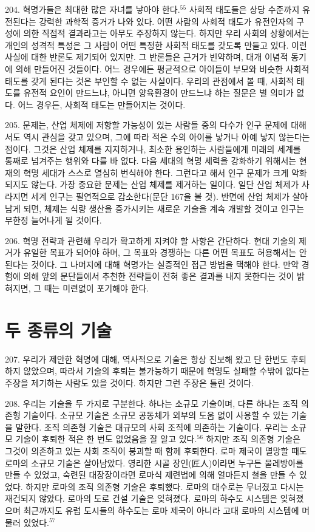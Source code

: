 \documentclass[11pt,a4paper]{article}
\begin{document}
\begin{multicols}{2}
204. 혁명가들은 최대한 많은 자녀를 낳아야 한다.\hyperlink{55}{$^{55}$} 사회적 태도들은 상당 수준까지 유전된다는 강력한  과학적 증거가 나와 있다. 어떤 사람의 사회적 태도가 유전인자의 구성에 의한 직접적 결과라고는 아무도  주장하지 않는다. 하지만 우리 사회의 상황에서는 개인의 성격적 특성은 그 사람이 어떤 특정한 사회적  태도를 갖도록 만들고 있다. 이런 사실에 대한 반론도 제기되어 있지만. 그 반론들은 근거가 빈약하며, 
대개 이념적 동기에 의해 만들어진 것들이다. 어느 경우에든 평균적으로 아이들이 부모와 비슷한 사회적  태도를 갖게 된다는 것은 부인할 수 없는 사실이다. 우리의 관점에서 볼 때, 사회적 태도를 유전적 요인이  만드느냐, 아니면 양육환경이 만드느냐 하는 질문은 별 의미가 없다. 어느 경우든, 사회적 태도는  만들어지는 것이다. 


205. 문제는, 산업 체제에 저항할 가능성이 있는 사람들 중의 다수가 인구 문제에 대해서도 역시 관심을  갖고 있으며, 그에 따라 적은 수의 아이를 낳거나 아예 낳지 않는다는 점이다. 그것은 산업 체제를  지지하거나, 최소한 용인하는 사람들에게 미래의 세계를 통째로 넘겨주는 행위와 다를 바 없다. 다음 세대의 혁명 세력을 강화하기 위해서는 현재의 혁명 세대가 스스로 열심히 번식해야 한다. 그런다고 해서  인구 문제가 크게 악화되지도 않는다. 가장 중요한 문제는 산업 체제를 제거하는 일이다. 일단 산업  체제가 사라지면 세계 인구는 필연적으로 감소한다(문단 167을 볼 것). 반면에 산업 체제가 살아남게  되면, 체제는 식량 생산을 증가시키는 새로운 기술을 계속 개발할 것이고 인구는 무한정 늘어나게 될  것이다.  


206. 혁명 전략과 관련해 우리가 확고하게 지켜야 할 사항은 간단하다. 현대 기술의 제거가 유일한  목표가 되어야 하며, 그 목표와 경쟁하는 다른 어떤 목표도 허용해서는 안 된다는 것이다. 그 나머지에  대해 혁명가는 실증적인 접근 방법을 택해야 한다. 만약 경험에 의해 앞의 문단들에서 추천한 전략들이  전혀 좋은 결과를 내지 못한다는 것이 밝혀지면, 그 때는 미련없이 포기해야 한다.  


\section*{두 종류의 기술} 
207. 우리가 제안한 혁명에 대해, 역사적으로 기술은 항상 진보해 왔고 단 한번도 후퇴하지 않았으며,  따라서 기술의 후퇴는 불가능하기 때문에 혁명도 실패할 수밖에 없다는 주장을 제기하는 사람도 있을  것이다. 하지만 그런 주장은 틀린 것이다.  


208. 우리는 기술을 두 가지로 구분한다. 하나는 소규모 기술이며, 다른 하나는 조직 의존형 기술이다.  소규모 기술은 소규모 공동체가 외부의 도움 없이 사용할 수 있는 기술을 말한다. 조직 의존형 기술은  대규모의 사회 조직에 의존하는 기술이다. 우리는 소규모 기술이 후퇴한 적은 한 번도 없었음을 잘 알고  있다.\hyperlink{56}{$^{56}$} 하지만 조직 의존형 기술은 그것이 의존하고 있는 사회 조직이 붕괴할 때 함께 후퇴한다. 로마  제국이 멸망할 때도 로마의 소규모 기술은 살아남았다. 영리한 시골 장인(匠人)이라면 누구든 물레방아를 만들 수 있었고, 숙련된 대장장이라면 로마식 제련법에 의해 얼마든지 철을 만들 수 있었다. 하지만  로마의 조직 의존형 기술은 후퇴했다. 로마의 대수로는 무너졌고 다시는 재건되지 않았다. 로마의 도로  건설 기술은 잊혀졌다. 로마의 하수도 시스템은 잊혀졌으며 최근까지도 유럽 도시들의 하수도는 로마  제국이 아니라 고대 로마의 시스템에 머물러 있었다.\hyperlink{57}{$^{57}$} 



\end{multicols}
\end{document}
